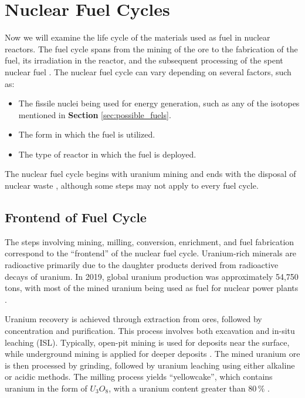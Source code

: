 \chapter{Nuclear Fuel Cycles}

Now we will examine the life cycle of the materials used as fuel in nuclear reactors. The fuel cycle spans from the mining of the ore to the fabrication of the fuel, its irradiation in the reactor, and the subsequent processing of the spent nuclear fuel \cite{fuel_cycle_book}. The nuclear fuel cycle can vary depending on several factors, such as:

\begin{itemize}
    \item The fissile nuclei being used for energy generation, such as any of the isotopes mentioned in \textbf{Section} \ref{sec:possible_fuels}.
    \item The form in which the fuel is utilized.
    \item The type of reactor in which the fuel is deployed.
\end{itemize}

The nuclear fuel cycle begins with uranium mining and ends with the disposal of nuclear waste \cite{fuel_cycle_book}, although some steps may not apply to every fuel cycle.

\section{Frontend of Fuel Cycle}

The steps involving mining, milling, conversion, enrichment, and fuel fabrication correspond to the ``frontend'' of the nuclear fuel cycle. Uranium-rich minerals are radioactive primarily due to the daughter products derived from radioactive decays of uranium. In 2019, global uranium production was approximately 54,750 tons, with most of the mined uranium being used as fuel for nuclear power plants \cite{fuel_cycle_book}.

Uranium recovery is achieved through extraction from ores, followed by concentration and purification. This process involves both excavation and in-situ leaching (ISL). Typically, open-pit mining is used for deposits near the surface, while underground mining is applied for deeper deposits \cite{fuel_cycle_book}. The mined uranium ore is then processed by grinding, followed by uranium leaching using either alkaline or acidic methods. The milling process yields ``yellowcake'', which contains uranium in the form of \(U_3O_8\), with a uranium content greater than \(80 \, \%\) \cite{fuel_cycle_book}.

